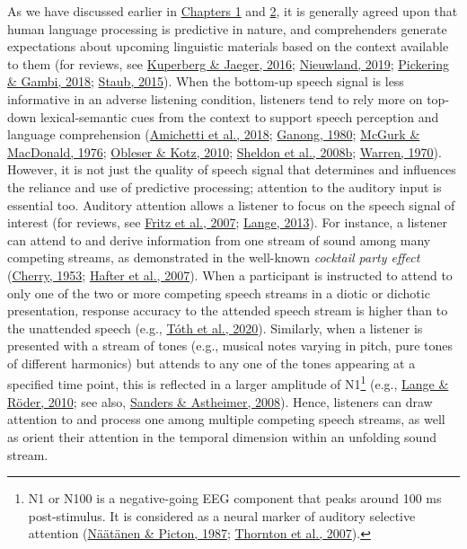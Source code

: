 \documentclass[a4paper, nobind]{templates/ociamthesis}
\begin{document}
As we have discussed earlier in \protect\hyperlink{chapter-introduction}{Chapters 1} and \protect\hyperlink{chapter-background}{2}, it is generally agreed upon that human language processing is predictive in nature,
and comprehenders generate expectations about upcoming linguistic materials based on the context available to them (for reviews, see \protect\hyperlink{ref-Kuperberg2016}{Kuperberg \& Jaeger, 2016}; \protect\hyperlink{ref-Nieuwland2019}{Nieuwland, 2019}; \protect\hyperlink{ref-Pickering2018}{Pickering \& Gambi, 2018}; \protect\hyperlink{ref-Staub2015}{Staub, 2015}).
When the bottom-up speech signal is less informative in an adverse listening condition, listeners tend to rely more on top-down lexical-semantic cues from the context to support speech perception and language comprehension (\protect\hyperlink{ref-Amichetti2018}{Amichetti et al., 2018}; \protect\hyperlink{ref-Ganong1980}{Ganong, 1980}; \protect\hyperlink{ref-McGurk1976}{McGurk \& MacDonald, 1976}; \protect\hyperlink{ref-Obleser2010}{Obleser \& Kotz, 2010}; \protect\hyperlink{ref-Sheldon2008b}{Sheldon et al., 2008b}; \protect\hyperlink{ref-Warren1970}{Warren, 1970}).
However, it is not just the quality of speech signal that determines and influences the reliance and use of predictive processing;
attention to the auditory input is essential too.
Auditory attention allows a listener to focus on the speech signal of interest (for reviews, see \protect\hyperlink{ref-Fritz2007}{Fritz et al., 2007}; \protect\hyperlink{ref-Lange2013}{Lange, 2013}).
For instance, a listener can attend to and derive information from one stream of sound among many competing streams, as demonstrated in the well-known \emph{cocktail party effect} (\protect\hyperlink{ref-Cherry1953}{Cherry, 1953}; \protect\hyperlink{ref-Hafter2007}{Hafter et al., 2007}).
When a participant is instructed to attend to only one of the two or more competing speech streams in a diotic or dichotic presentation, response accuracy to the attended speech stream is higher than to the unattended speech (e.g., \protect\hyperlink{ref-Toth2020}{Tóth et al., 2020}).
Similarly, when a listener is presented with a stream of tones (e.g., musical notes varying in pitch, pure tones of different harmonics) but attends to any one of the tones appearing at a specified time point, this is reflected in a larger amplitude of N1\footnote{N1 or N100 is a negative-going EEG component that peaks around 100 ms post-stimulus. It is considered as a neural marker of auditory selective attention (\protect\hyperlink{ref-Naatanen1987}{Näätänen \& Picton, 1987}; \protect\hyperlink{ref-Thornton2007}{Thornton et al., 2007}).} (e.g., \protect\hyperlink{ref-Lange2010}{Lange \& Röder, 2010}; see also, \protect\hyperlink{ref-Sanders2008}{Sanders \& Astheimer, 2008}).
Hence, listeners can draw attention to and process one among multiple competing speech streams,
as well as orient their attention in the temporal dimension within an unfolding sound stream.
\end{document}

